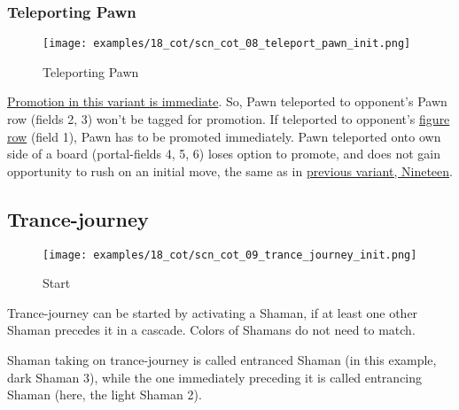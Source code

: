\clearpage %

\subsubsection*{Teleporting Pawn}

\vspace*{-1.2\baselineskip}
\noindent
\begin{figure}[!h]
\texttt{[image: examples/18\_cot/scn\_cot\_08\_teleport\_pawn\_init.png]}
\caption{Teleporting Pawn}
\label{fig:scn_cot_08_teleport_pawn_init}
\end{figure}

\hyperref[sec:Conquest of Tlalocan/Promotion]{Promotion in this variant is immediate}.
So, Pawn teleported to opponent's Pawn row (fields 2, 3) won't be tagged for promotion.
If teleported to opponent's \hyperref[sec:Terms/Figure row]{figure row} (field 1), Pawn
has to be promoted immediately.
Pawn teleported onto own side of a board (portal-fields 4, 5, 6) loses option to promote,
and does not gain opportunity to rush on an initial move, the same as in
\hyperref[fig:scn_n_12_teleport_pawns_step_1]{previous variant, Nineteen}.

\clearpage %

\subsection*{Trance-journey}

\noindent
\begin{wrapfigure}[13]{l}{0.4\textwidth}
\centering
\texttt{[image: examples/18\_cot/scn\_cot\_09\_trance\_journey\_init.png]}
\caption{Start}
\label{fig:scn_cot_09_trance_journey_init}
\end{wrapfigure}
Trance-journey can be started by activating a Shaman, if at least one other
Shaman precedes it in a cascade. Colors of Shamans do not need to match.

Shaman taking on trance-journey is called entranced Shaman (in this example,
dark Shaman 3), while the one immediately preceding it is called entrancing
Shaman (here, the light Shaman 2).

